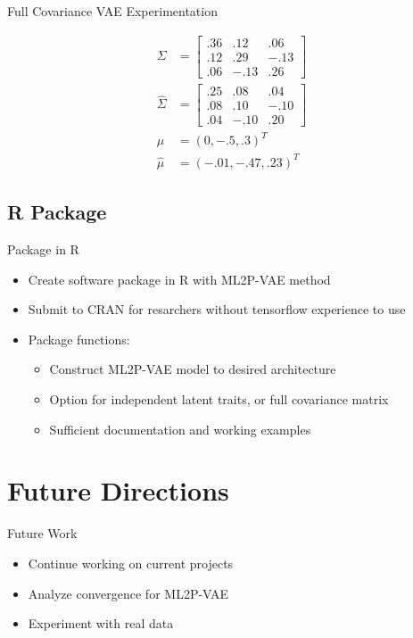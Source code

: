 \documentclass{beamer}
\theoremstyle{definition}
\begin{document}
\begin{frame}{Full Covariance VAE Experimentation}
\begin{figure}
\endminipage
\hfill
{}
\scriptsize
    \begin{align*}
    \Sigma &= \begin{bmatrix}
    .36 &  .12 & .06 \\
    .12 & .29 & -.13 \\
    .06 & -.13 & .26
    \end{bmatrix} \\ 
    \hat \Sigma &= \begin{bmatrix}
    .25 & .08 & .04 \\
    .08 & .10 & -.10 \\
    .04 & -.10 & .20
    \end{bmatrix} \\
    \mu &= (0, -.5, .3)^T \\
    \hat \mu &= (-.01, -.47, .23)^T
    \end{align*}
\endminipage
\hfill
\end{figure}
\end{frame}


\subsection{R Package}
\begin{frame}{Package in R}
\begin{itemize}
  \item Create software package in R with ML2P-VAE method
  \item Submit to CRAN for resarchers without tensorflow experience to use
  \item<2-> Package functions:
  \begin{itemize}
    \item<2-> Construct ML2P-VAE model to desired architecture
    \item<2-> Option for independent latent traits, or full covariance matrix
    \item<2-> Sufficient documentation and working examples
  \end{itemize}
\end{itemize}
\end{frame}


\section{Future Directions}
\begin{frame}{Future Work}
\begin{itemize}
  \item Continue working on current projects
  \item Analyze convergence for ML2P-VAE
  \item Experiment with real data
\end{itemize}
\end{frame}
\end{document}
